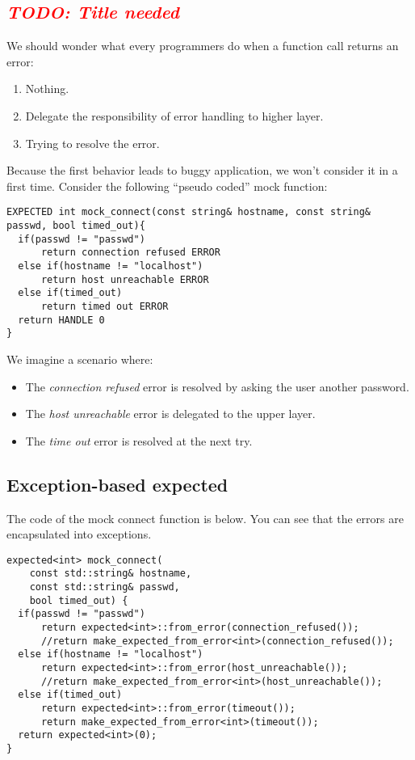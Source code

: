 \documentclass[a4paper,10pt]{article}
\newcommand{\todo}[1]{\emph{\textcolor{red}{TODO: #1}}}
\begin{document}
\subsection{\todo{Title needed}}

We should wonder what every programmers do when a function call returns an error:

\begin{enumerate}
 \item Nothing.
 \item Delegate the responsibility of error handling to higher layer.
 \item Trying to resolve the error.
\end{enumerate}

Because the first behavior leads to buggy application, we won't consider it in a first time. Consider the following ``pseudo coded'' mock function:

\begin{lstlisting}
EXPECTED int mock_connect(const string& hostname, const string& passwd, bool timed_out){
  if(passwd != "passwd")
      return connection refused ERROR
  else if(hostname != "localhost")
      return host unreachable ERROR
  else if(timed_out)
      return timed out ERROR
  return HANDLE 0
}
\end{lstlisting}

We imagine a scenario where:

\begin{itemize}
 \item The \textit{connection refused} error is resolved by asking the user another password.
 \item The \textit{host unreachable} error is delegated to the upper layer.
 \item The \textit{time out} error is resolved at the next try.
\end{itemize}

\subsection{Exception-based expected}

The code of the mock connect function is below. You can see that the errors are encapsulated into exceptions.
\begin{lstlisting}
expected<int> mock_connect(
    const std::string& hostname, 
    const std::string& passwd, 
    bool timed_out) {
  if(passwd != "passwd")
      return expected<int>::from_error(connection_refused());
      //return make_expected_from_error<int>(connection_refused());
  else if(hostname != "localhost")
      return expected<int>::from_error(host_unreachable());
      //return make_expected_from_error<int>(host_unreachable());
  else if(timed_out)
      return expected<int>::from_error(timeout());
      return make_expected_from_error<int>(timeout());
  return expected<int>(0);
}
\end{lstlisting}
\end{document}
